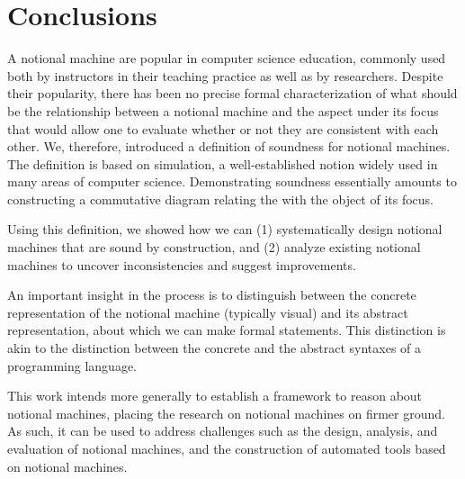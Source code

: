 \section{Conclusions}
\label{sec:Conclusions}

A notional machine
are popular in computer science education,
commonly used both by instructors in their teaching practice
as well as by researchers.
%
Despite
their popularity,
there has been no precise formal characterization of
what should be the relationship between
a notional machine
and the aspect under its focus
%
that would allow one to
evaluate whether or not they are consistent with each other.
%
%
We, therefore, introduced
a definition
of soundness for notional machines.
The definition is based on
simulation,
a
well-established notion
widely used in many areas of computer science.
%
Demonstrating soundness essentially
amounts to
constructing
a commutative diagram relating the \nm{}
with the object of its focus.


Using this definition,
we
showed how we can
(1)
systematically
design notional machines that are sound by construction,
%
and
(2)
analyze existing notional machines
to uncover inconsistencies
and suggest improvements.


An important insight
in the process
is to
distinguish between
the concrete representation of the notional machine
(typically visual)
and its abstract representation,
about which we can make formal statements.
%
This distinction is akin to the distinction between
the concrete and the abstract syntaxes of a programming language.
 




This work intends more generally to establish a
framework to reason about notional machines,
placing the research on notional machines on firmer ground.
As such,
it can be
used
to address challenges
such as the design, analysis, and evaluation of notional machines,
and
the construction of automated tools based on notional machines.


